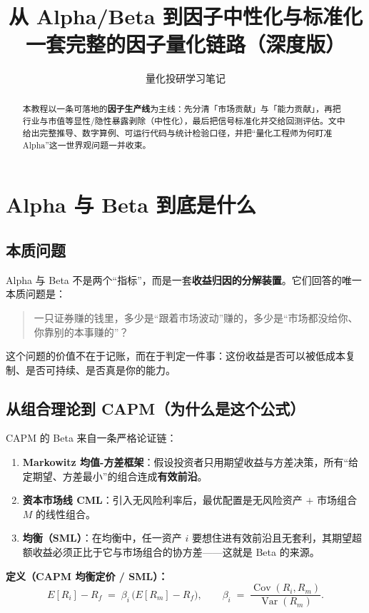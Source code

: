 \documentclass[UTF8,11pt]{ctexart}
\title{\bfseries 从 Alpha/Beta 到因子中性化与标准化\\[2pt]\large 一套完整的因子量化链路（深度版）}
\author{量化投研学习笔记}
\date{}
\begin{document}
\maketitle

\begin{abstract}
本教程以一条可落地的\textbf{因子生产线}为主线：先分清「市场贡献」与「能力贡献」，再把行业与市值等显性/隐性暴露剥除（中性化），最后把信号标准化并交给回测评估。文中给出完整推导、数字算例、可运行代码与统计检验口径，并把“量化工程师为何盯准 Alpha”这一世界观问题一并收束。
\end{abstract}

\tableofcontents
\newpage

\section{Alpha 与 Beta 到底是什么}

\subsection{本质问题}
Alpha 与 Beta 不是两个“指标”，而是一套\textbf{收益归因的分解装置}。它们回答的唯一本质问题是：
\begin{quote}
一只证券赚的钱里，多少是“跟着市场波动”赚的，多少是“市场都没给你、你靠别的本事赚的”？
\end{quote}
这个问题的价值不在于记账，而在于判定一件事：这份收益是否可以被低成本复制、是否可持续、是否真是你的能力。

\subsection{从组合理论到 CAPM（为什么是这个公式）}
CAPM 的 Beta 来自一条严格论证链：
\begin{enumerate}[itemsep=2pt]
\item \textbf{Markowitz 均值-方差框架}：假设投资者只用期望收益与方差决策，所有“给定期望、方差最小”的组合连成\textbf{有效前沿}。
\item \textbf{资本市场线 CML}：引入无风险利率后，最优配置是无风险资产 $+$ 市场组合 $M$ 的线性组合。
\item \textbf{均衡（SML）}：在均衡中，任一资产 $i$ 要想住进有效前沿且无套利，其期望超额收益必须正比于它与市场组合的协方差——这就是 Beta 的来源。
\end{enumerate}

\textbf{定义（CAPM 均衡定价 / SML）：}
\begin{equation}
E[R_i]-R_f \;=\; \beta_i\,\big(E[R_m]-R_f\big),
\qquad
\beta_i \;=\; \frac{\operatorname{Cov}(R_i,R_m)}{\operatorname{Var}(R_m)}.
\end{equation}
\end{document}
